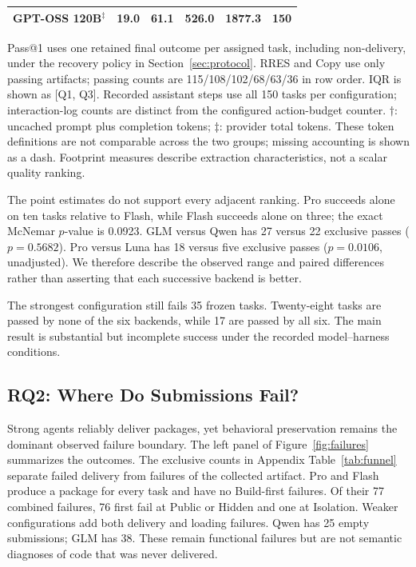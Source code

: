 \documentclass[acmsmall,screen,review,anonymous,nonacm]{acmart}
\begin{document}
\begin{table}[tbp]
\begin{tabularx}{\linewidth}{@{}Xrrrrr@{}}
 GPT-OSS 120B$^{\ddagger}$ & 19.0 & 61.1 & 526.0 & 1877.3 & 150 \\
 \bottomrule
 \end{tabularx}
 \par\smallskip\begin{minipage}{\linewidth}\footnotesize
 Pass@1 uses one retained final outcome per assigned task, including non-delivery, under the recovery policy in Section~\ref{sec:protocol}. RRES and Copy use only passing artifacts; passing counts are 115/108/102/68/63/36 in row order. IQR is shown as [Q1, Q3]. Recorded assistant steps use all 150 tasks per configuration; interaction-log counts are distinct from the configured action-budget counter. $\dagger$: uncached prompt plus completion tokens; $\ddagger$: provider total tokens. These token definitions are not comparable across the two groups; missing accounting is shown as a dash. Footprint measures describe extraction characteristics, not a scalar quality ranking.
 \end{minipage}
\end{table}


The point estimates do not support every adjacent ranking. Pro succeeds alone
on ten tasks relative to Flash, while Flash succeeds alone on three; the exact
McNemar $p$-value is 0.0923. GLM versus Qwen has 27 versus 22 exclusive passes
($p=0.5682$). Pro versus Luna has 18 versus five exclusive passes
($p=0.0106$, unadjusted). We therefore describe the observed range and paired
differences rather than asserting that each successive backend is better.

The strongest configuration still fails 35 frozen tasks. Twenty-eight tasks
are passed by none of the six backends, while 17 are passed by all six. The main result is substantial but incomplete success under the recorded
model--harness conditions.

\subsection{RQ2: Where Do Submissions Fail?}
\label{sec:rq2}

Strong agents reliably deliver packages, yet behavioral preservation remains
the dominant observed failure boundary. The left panel of
Figure~\ref{fig:failures} summarizes the outcomes.
The exclusive counts in Appendix Table~\ref{tab:funnel} separate failed delivery from
failures of the collected artifact. Pro and Flash produce a package for every
task and have no Build-first failures. Of their 77 combined failures, 76 first
fail at Public or Hidden and one at Isolation. Weaker configurations add both
delivery and loading failures. Qwen has 25 empty submissions; GLM has 38. These
remain functional failures but are not semantic diagnoses of code that was
never delivered.
\end{document}
